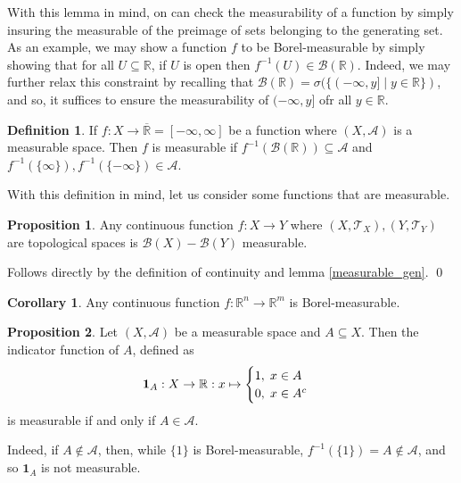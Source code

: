 \documentclass[
]{article}
\theoremstyle{definition}
\newtheorem{prop}{Proposition}
\newtheorem{corollary}{Corollary}[theorem]
\theoremstyle{definition}
\newtheorem{definition}{Definition}[section]
\begin{document}
With this lemma in mind, on can check the measurability of a function by
simply insuring the measurable of the preimage of sets belonging to the
generating set. As an example, we may show a function \(f\) to be
Borel-measurable by simply showing that for all
\(U \subseteq \mathbb{R}\), if \(U\) is open then
\(f^{-1}(U) \in \mathcal{B}(\mathbb{R})\). Indeed, we may further relax
this constraint by recalling that
\(\mathcal{B}(\mathbb{R}) = \sigma(\{(-\infty, y] \mid y \in \mathbb{R}\})\),
and so, it suffices to ensure the measurability of \((-\infty, y]\) ofr
all \(y \in \mathbb{R}\).

\begin{definition}
  If \(f : X \to \overline{\mathbb{R}} = [-\infty, \infty]\) be a function where 
  \((X, \mathcal{A})\) is a measurable space. Then \(f\) is 
  measurable if \(f^{-1}(\mathcal{B}(\mathbb{R})) \subseteq \mathcal{A}\) and 
  \(f^{-1}(\{\infty\}), f^{-1}(\{- \infty\}) \in \mathcal{A}\).
\end{definition}

With this definition in mind, let us consider some functions that are
measurable.

\begin{prop}
  Any continuous function \(f : X \to Y\) where \((X, \mathcal{T}_X), (Y, \mathcal{T}_Y)\) 
  are topological spaces is \(\mathcal{B}(X) - \mathcal{B}(Y)\) measurable.
\end{prop}
\proof

Follows directly by the definition of continuity and lemma
\ref{measurable_gen}. \qed

\begin{corollary}
  Any continuous function \(f : \mathbb{R}^n \to \mathbb{R}^m\) is Borel-measurable.
\end{corollary}

\begin{prop}
  Let \((X, \mathcal{A})\) be a measurable space and \(A \subseteq X\). Then 
  the indicator function of \(A\), defined as 
  \[\mathbf{1}_A : X \to \mathbb{R} : x \mapsto 
  \begin{cases}
    1, \hspace{1mm} x \in A\\
    0, \hspace{1mm} x \in A^c
  \end{cases}\]
  is measurable if and only if \(A \in \mathcal{A}\).
\end{prop}
\proof

Indeed, if \(A \not\in \mathcal{A}\), then, while \(\{1\}\) is
Borel-measurable, \(f^{-1}(\{1\}) = A \not\in \mathcal{A}\), and so
\(\mathbf{1}_A\) is not measurable.
\end{document}
